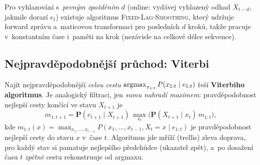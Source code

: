 \begin{poznamka}
Pro vyhlazování s~\emph{pevným zpožděním} $d$ (online: vydávej vyhlazený odhad $X_{t-d}$, jakmile dorazí $e_t$) existuje algoritmus \textsc{Fixed-Lag-Smoothing}, který udržuje forward zprávu a~maticovou transformaci pro posledních $d$ kroků, takže pracuje v~konstantním čase i~paměti na krok (nezávisle na celkové délce sekvence).
\end{poznamka}

\subsection{Nejpravděpodobnější průchod: Viterbi}

Najít nejpravděpodobnější \emph{celou cestu} $\operatorname*{argmax}_{x_{1:t}} P(x_{1:t}\mid e_{1:t})$ řeší \textbf{Viterbiho algoritmus}. Je analogický filtraci, jen \emph{sumu nahradí maximem}: pravděpodobnost nejlepší cesty končící ve stavu $X_{t+1}$ je
\[
  m_{1:t+1} = \mathbf{P}(e_{t+1}\mid X_{t+1})\,\max_{x_t}\big(\mathbf{P}(X_{t+1}\mid x_t)\,m_{1:t}\big),
\]
kde $m_{1:t}(x) = \max_{x_1,\dots,x_{t-1}} P(x_1,\dots,x_{t-1},X_t{=}x\mid e_{1:t})$ je pravděpodobnost nejlepší cesty do stavu $x$ v~čase $t$. Algoritmus jde mříží (trellis) zleva doprava, pro každý stav si pamatuje nejlepšího předchůdce (ukazatel zpět), a~po dosažení času $t$ \emph{zpětně} cestu rekonstruuje od argmaxu.

